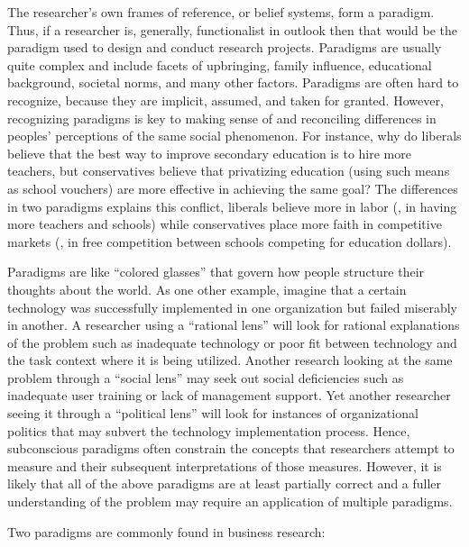 The researcher's own frames of reference, or belief systems, form a paradigm. Thus, if a researcher is, generally, functionalist in outlook then that would be the paradigm used to design and conduct research projects. Paradigms are usually quite complex and include facets of upbringing, family influence, educational background, societal norms, and many other factors. Paradigms are often hard to recognize, because they are implicit, assumed, and taken for granted. However, recognizing paradigms is key to making sense of and reconciling differences in peoples' perceptions of the same social phenomenon. For instance, why do liberals believe that the best way to improve secondary education is to hire more teachers, but conservatives believe that privatizing education (using such means as school vouchers) are more effective in achieving the same goal? The differences in two paradigms explains this conflict, liberals believe more in labor (\ie, in having more teachers and schools) while conservatives place more faith in competitive markets (\ie, in free competition between schools competing for education dollars). 

Paradigms are like ``colored glasses'' that govern how people structure their thoughts about the world. As one other example, imagine that a certain technology was successfully implemented in one organization but failed miserably in another. A researcher using a ``rational lens'' will look for rational explanations of the problem such as inadequate technology or poor fit between technology and the task context where it is being utilized. Another research looking at the same problem through a ``social lens'' may seek out social deficiencies such as inadequate user training or lack of management support. Yet another researcher seeing it through a ``political lens'' will look for instances of organizational politics that may subvert the technology implementation process. Hence, subconscious paradigms often constrain the concepts that researchers attempt to measure and their subsequent interpretations of those measures. However, it is likely that all of the above paradigms are at least partially correct and a fuller understanding of the problem may require an application of multiple paradigms.

Two paradigms are commonly found in business research:


